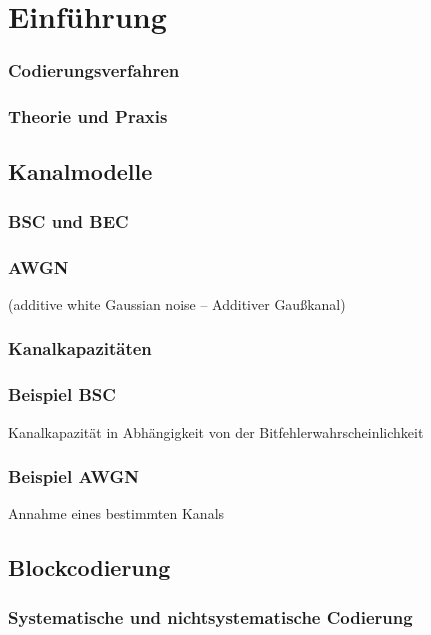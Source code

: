 \section{Einführung}
\subsubsection*{Codierungsverfahren}
\subsubsection*{Theorie und Praxis}

\subsection{Kanalmodelle}
\subsubsection{BSC und BEC}

\subsubsection{AWGN}
(additive white Gaussian noise -- Additiver Gaußkanal)

\subsubsection{Kanalkapazitäten}

\subsubsection*{Beispiel BSC}
Kanalkapazität in Abhängigkeit von der Bitfehlerwahrscheinlichkeit
\subsubsection*{Beispiel AWGN}
Annahme eines bestimmten Kanals

\subsection{Blockcodierung}

\subsubsection{Systematische und nichtsystematische Codierung}

